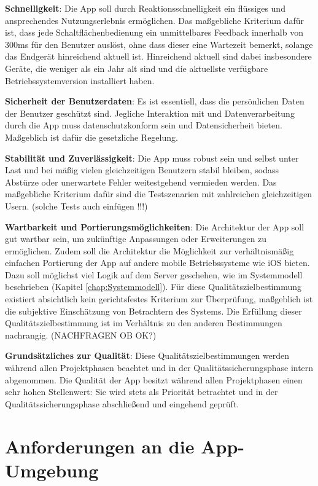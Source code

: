 \documentclass[oneside, ngerman]{sdqtechreport}
\begin{document}
\textbf{Schnelligkeit}: Die App soll durch Reaktionsschnelligkeit ein flüssiges und ansprechendes Nutzungserlebnis ermöglichen. Das maßgebliche Kriterium dafür ist, dass jede Schaltflächenbedienung ein unmittelbares Feedback innerhalb von 300ms für den Benutzer auslöst, ohne dass dieser eine Wartezeit bemerkt, solange das Endgerät hinreichend aktuell ist. Hinreichend aktuell sind dabei insbesondere Geräte, die weniger als ein Jahr alt sind und die aktuellste verfügbare Betriebssystemversion installiert haben.

\textbf{Sicherheit der Benutzerdaten}: Es ist essentiell, dass die persönlichen Daten der Benutzer geschützt sind. Jegliche Interaktion mit und Datenverarbeitung durch die App muss datenschutzkonform sein und Datensicherheit bieten. Maßgeblich ist dafür die gesetzliche Regelung.

\textbf{Stabilität und Zuverlässigkeit}: Die App muss robust sein und selbst unter Last und bei mäßig vielen gleichzeitigen Benutzern stabil bleiben, sodass Abstürze oder unerwartete Fehler weitestgehend vermieden werden. Das maßgebliche Kriterium dafür sind die Testszenarien mit zahlreichen gleichzeitigen Usern. (solche Tests auch einfügen !!!)

\textbf{Wartbarkeit und Portierungsmöglichkeiten}: Die Architektur der App soll gut wartbar sein, um zukünftige Anpassungen oder Erweiterungen zu ermöglichen. Zudem soll die Architektur die Möglichkeit zur verhältnismäßig einfachen Portierung der App auf andere mobile Betriebssysteme wie iOS bieten. Dazu soll möglichst viel Logik auf dem Server geschehen, wie im Systemmodell beschrieben (Kapitel \ref{chap:Systemmodell}). Für diese Qualitätszielbestimmung existiert absichtlich kein gerichtsfestes Kriterium zur Überprüfung, maßgeblich ist die subjektive Einschätzung von Betrachtern des Systems. Die Erfüllung dieser Qualitätszielbestimmung ist im Verhältnis zu den anderen Bestimmungen nachrangig. (NACHFRAGEN OB OK?)

\textbf{Grundsätzliches zur Qualität}: Diese Qualitätszielbestimmungen werden während allen Projektphasen beachtet und in der Qualitätssicherungsphase intern abgenommen. Die Qualität der App besitzt während allen Projektphasen einen sehr hohen Stellenwert: Sie wird stets als Priorität betrachtet und in der Qualitätssicherungsphase abschließend und eingehend geprüft.



\chapter{Anforderungen an die App-Umgebung}
\label{chap:Appumgebung}
\end{document}
